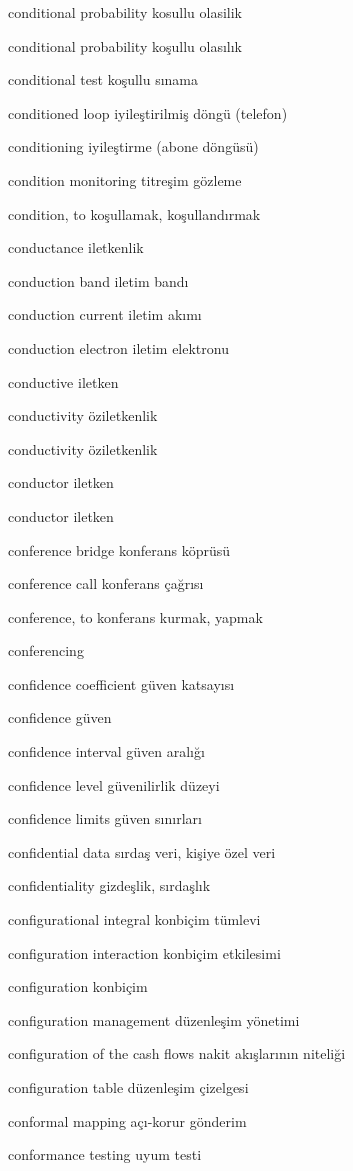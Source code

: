 \documentclass[12pt,fleqn]{article}\usepackage{../../common}
\begin{document}
conditional probability kosullu olasilik

conditional probability koşullu olasılık

conditional test koşullu sınama

conditioned loop iyileştirilmiş döngü (telefon)

conditioning iyileştirme (abone döngüsü)

condition monitoring titreşim gözleme

condition, to koşullamak, koşullandırmak

conductance iletkenlik

conduction band iletim bandı

conduction current iletim akımı

conduction electron iletim elektronu

conductive iletken

conductivity öziletkenlik

conductivity öziletkenlik

conductor iletken

conductor iletken

conference bridge konferans köprüsü

conference call konferans çağrısı

conference, to konferans kurmak, yapmak

conferencing

confidence coefficient güven katsayısı

confidence güven

confidence interval güven aralığı

confidence level güvenilirlik düzeyi

confidence limits güven sınırları

confidential data sırdaş veri, kişiye özel veri

confidentiality gizdeşlik, sırdaşlık

configurational integral konbiçim tümlevi

configuration interaction konbiçim etkilesimi

configuration konbiçim

configuration management düzenleşim yönetimi

configuration of the cash flows nakit akışlarının niteliği

configuration table düzenleşim çizelgesi

conformal mapping açı-korur gönderim

conformance testing uyum testi
\end{document}
